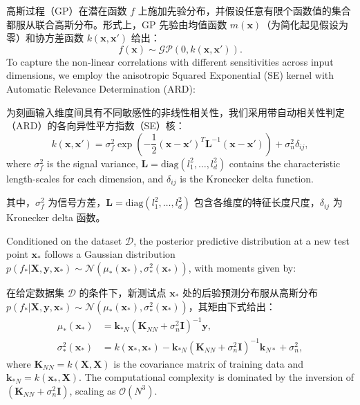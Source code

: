 \documentclass[11pt]{article}
\begin{document}
高斯过程（GP）在潜在函数 $f$ 上施加先验分布，并假设任意有限个函数值的集合都服从联合高斯分布。形式上，GP 先验由均值函数 $m(\mathbf{x})$（为简化起见假设为零）和协方差函数 $k(\mathbf{x}, \mathbf{x}')$ 给出：
\begin{equation}
	f(\mathbf{x}) \sim \mathcal{GP}(0, k(\mathbf{x}, \mathbf{x}')).
\end{equation}
To capture the non-linear correlations with different sensitivities across input dimensions, we employ the anisotropic Squared Exponential (SE) kernel with Automatic Relevance Determination (ARD):

为刻画输入维度间具有不同敏感性的非线性相关性，我们采用带自动相关性判定（ARD）的各向异性平方指数（SE）核：
\begin{equation}
	k(\mathbf{x}, \mathbf{x}') = \sigma_f^2 \exp \left( - \frac{1}{2} (\mathbf{x} - \mathbf{x}')^T \mathbf{L}^{-1} (\mathbf{x} - \mathbf{x}') \right) + \sigma_n^2 \delta_{ij},
\end{equation}
where $\sigma_f^2$ is the signal variance, $\mathbf{L} = \text{diag}(l_1^2, \ldots, l_d^2)$ contains the characteristic length-scales for each dimension, and $\delta_{ij}$ is the Kronecker delta function.

其中，$\sigma_f^2$ 为信号方差，$\mathbf{L} = \text{diag}(l_1^2, \ldots, l_d^2)$ 包含各维度的特征长度尺度，$\delta_{ij}$ 为 Kronecker delta 函数。

Conditioned on the dataset $\mathcal{D}$, the posterior predictive distribution at a new test point $\mathbf{x}_*$ follows a Gaussian distribution $p(f_* | \mathbf{X}, \mathbf{y}, \mathbf{x}_*) \sim \mathcal{N}(\mu_*(\mathbf{x}_*), \sigma_*^2(\mathbf{x}_*))$, with moments given by:

在给定数据集 $\mathcal{D}$ 的条件下，新测试点 $\mathbf{x}_*$ 处的后验预测分布服从高斯分布 $p(f_* | \mathbf{X}, \mathbf{y}, \mathbf{x}_*) \sim \mathcal{N}(\mu_*(\mathbf{x}_*), \sigma_*^2(\mathbf{x}_*))$，其矩由下式给出：
\begin{equation}
	\begin{aligned}
		\mu_*(\mathbf{x}_*) &= \mathbf{k}_{*N} (\mathbf{K}_{NN} + \sigma_n^2 \mathbf{I})^{-1} \mathbf{y}, \\
		\sigma_*^2(\mathbf{x}_*) &= k(\mathbf{x}_*, \mathbf{x}_*) - \mathbf{k}_{*N} (\mathbf{K}_{NN} + \sigma_n^2 \mathbf{I})^{-1} \mathbf{k}_{N*} + \sigma_n^2,
	\end{aligned}
\end{equation}
where $\mathbf{K}_{NN} = k(\mathbf{X}, \mathbf{X})$ is the covariance matrix of training data and $\mathbf{k}_{*N} = k(\mathbf{x}_*, \mathbf{X})$. The computational complexity is dominated by the inversion of $(\mathbf{K}_{NN} + \sigma_n^2 \mathbf{I})$, scaling as $\mathcal{O}(N^3)$.
\end{document}
